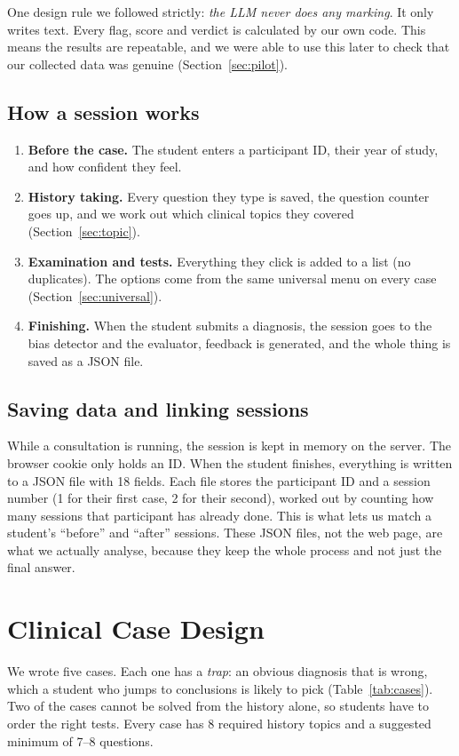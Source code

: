\documentclass[conference]{IEEEtran}
\begin{document}
One design rule we followed strictly: \emph{the LLM never does any marking}. It
only writes text. Every flag, score and verdict is calculated by our own code.
This means the results are repeatable, and we were able to use this later to
check that our collected data was genuine (Section~\ref{sec:pilot}).

\subsection{How a session works}
\begin{enumerate}
  \item \textbf{Before the case.} The student enters a participant ID, their year
  of study, and how confident they feel.
  \item \textbf{History taking.} Every question they type is saved, the question
  counter goes up, and we work out which clinical topics they covered
  (Section~\ref{sec:topic}).
  \item \textbf{Examination and tests.} Everything they click is added to a list
  (no duplicates). The options come from the same universal menu on every case
  (Section~\ref{sec:universal}).
  \item \textbf{Finishing.} When the student submits a diagnosis, the session
  goes to the bias detector and the evaluator, feedback is generated, and the
  whole thing is saved as a JSON file.
\end{enumerate}

\subsection{Saving data and linking sessions}
While a consultation is running, the session is kept in memory on the server. The
browser cookie only holds an ID. When the student finishes, everything is written
to a JSON file with 18 fields. Each file stores the participant ID and a session
number (1 for their first case, 2 for their second), worked out by counting how
many sessions that participant has already done. This is what lets us match a
student's ``before'' and ``after'' sessions. These JSON files, not the web page,
are what we actually analyse, because they keep the whole process and not just
the final answer.

\section{Clinical Case Design}
\label{sec:cases}
We wrote five cases. Each one has a \emph{trap}: an obvious diagnosis that is
wrong, which a student who jumps to conclusions is likely to pick
(Table~\ref{tab:cases}). Two of the cases cannot be solved from the history
alone, so students have to order the right tests. Every case has 8 required
history topics and a suggested minimum of 7--8 questions.
\end{document}
